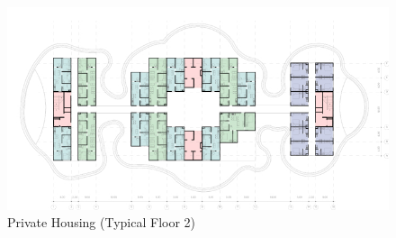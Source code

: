 \begin{figure}[H]
	\centering
	\includegraphics[width=\linewidth]{src/graphics/nurture--priv-housing-typical-floor-02.jpg}
	\caption*{%
		Private Housing (Typical Floor 2)
	}
	\label{
		fig:nurture--priv-housing-typical-floor-02
	}
\end{figure}
